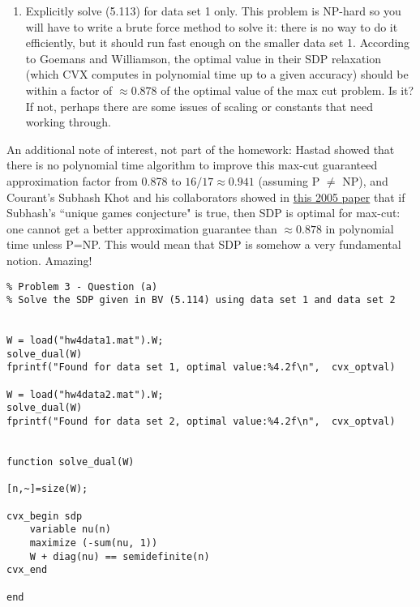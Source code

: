 \documentclass[11pt]{article}
\begin{document}
\begin{enumerate}
\begin{enumerate}
 \item Explicitly solve (5.113) for data set 1 only.
 This problem is NP-hard so you will have to write a brute force method to solve it: there is no way to do it efficiently, but it should
 run fast enough on the smaller data set 1. According to Goemans and Williamson,
 the optimal value in their SDP relaxation (which CVX computes in polynomial time up to a given accuracy)
 should be within a factor of $\approx 0.878$ of the optimal value of the max cut problem. Is it? If not, perhaps there are some issues of scaling
 or constants that need working through. 
 \end{enumerate}
 
 An additional note of interest, not part of the homework: 
Hastad showed that there is no polynomial time algorithm to improve
 this max-cut guaranteed approximation factor from 0.878 to $16/17\approx 0.941$ (assuming P $\not =$ NP), and 
 Courant's Subhash Khot and his collaborators showed in 
 \href{https://www.cs.cmu.edu/~odonnell/papers/maxcut.pdf}{this 2005 paper} that if Subhash's ``unique games conjecture" is true, then SDP is optimal for max-cut: one cannot get a better approximation
guarantee than $\approx 0.878$ in polynomial time unless P=NP. 
This would mean that SDP is somehow a very fundamental notion. Amazing!
 
\end{enumerate}

\begin{verbatim}
% Problem 3 - Question (a) 
% Solve the SDP given in BV (5.114) using data set 1 and data set 2


W = load("hw4data1.mat").W;
solve_dual(W)
fprintf("Found for data set 1, optimal value:%4.2f\n",  cvx_optval)

W = load("hw4data2.mat").W;
solve_dual(W)
fprintf("Found for data set 2, optimal value:%4.2f\n",  cvx_optval)


function solve_dual(W)

[n,~]=size(W);

cvx_begin sdp
    variable nu(n)
    maximize (-sum(nu, 1))
    W + diag(nu) == semidefinite(n)
cvx_end

end

\end{verbatim}
\end{document}
